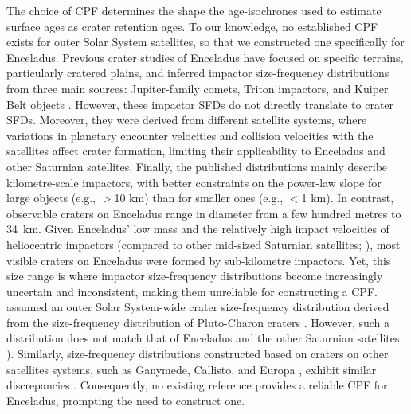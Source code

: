 \documentclass[preprint,12pt,3p,times,authoryear]{elsarticle}
\begin{document}
The choice of CPF determines the shape the age-isochrones used to estimate surface ages as crater retention ages. To our knowledge, no established CPF exists for outer Solar System satellites, so that we constructed one specifically for Enceladus. Previous crater studies of Enceladus have focused on specific terrains, particularly cratered plains, and inferred impactor size-frequency distributions from three main sources: Jupiter-family comets, Triton impactors, and Kuiper Belt objects \citep{Zahnle2003, Singer2019, Bottke2024}. 
However, these impactor SFDs do not directly translate to crater SFDs. 
Moreover, they were derived from different satellite systems, where variations in planetary encounter velocities and collision velocities with the satellites affect crater formation, limiting their applicability to Enceladus and other Saturnian satellites. 
Finally, the published distributions mainly describe kilometre-scale impactors, with better constraints on the power-law slope for large objects (e.g., $>$10 km) than for smaller ones (e.g., $<$1 km). 
In contrast, observable craters on Enceladus range in diameter from a few hundred metres to 34~km. Given Enceladus’ low mass and the relatively high impact velocities of heliocentric impactors (compared to other mid-sized Saturnian satellites; \citealt{Zahnle2003, Wong2021}), most visible craters on Enceladus were formed by sub-kilometre impactors. Yet, this size range is where impactor size-frequency distributions become increasingly uncertain and inconsistent, making them unreliable for constructing a CPF. \\

\citet{Wong2023} assumed an outer Solar System-wide crater size-frequency distribution derived from the size-frequency distribution of Pluto-Charon craters \citep{Singer2019}. However, such a distribution does not match that of Enceladus and the other Saturnian satellites \citep{Kirchoff2022}). Similarly, size-frequency distributions constructed based on craters on other satellites systems, such as Ganymede, Callisto, and Europa \citep{Zahnle2003}, exhibit similar discrepancies \citep{Wong2023}. 
Consequently, no existing reference provides a reliable CPF for Enceladus, prompting the need to construct one.\\

\end{document}
